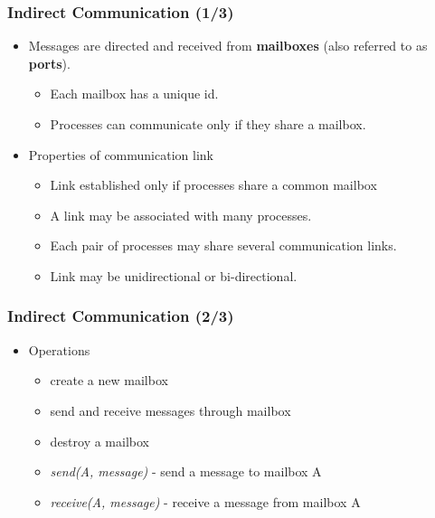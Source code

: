 \documentclass[CJKutf8,xcolor=pdftex,dvipsnames,table]{beamer}
\begin{document}
\begin{CJK*}{UTF8}{song}
  \begin{frame}
  \frametitle{Indirect Communication (1/3)} \pause
  \begin{itemize}
  \item{Messages are directed and received from \textbf{mailboxes} (also referred to as \textbf{ports}).} \pause
    \begin{itemize}
    \item{Each mailbox has a unique id.} \pause
    \item{Processes can communicate only if they share a mailbox.} \pause
    \end{itemize}
  \item{Properties of communication link} \pause
    \begin{itemize}
    \item{Link established only if processes share a common mailbox} \pause
    \item{A link may be associated with many processes.} \pause
    \item{Each pair of processes may share several communication links.} \pause
    \item{Link may be unidirectional or bi-directional.}
    \end{itemize}
  \end{itemize}
  \end{frame}

  \begin{frame}
  \frametitle{Indirect Communication (2/3)} \pause
  \begin{itemize}
  \item{Operations} \pause
    \begin{itemize}
    \item{create a new mailbox} \pause
    \item{send and receive messages through mailbox} \pause
    \item{destroy a mailbox} \pause
    \item{\emph{send(A, message)} \pause - send a message to mailbox A} \pause
    \item{\emph{receive(A, message)} \pause - receive a message from mailbox A}
    \end{itemize}
  \end{itemize}
  \end{frame}


\end{CJK*}
\end{document}

